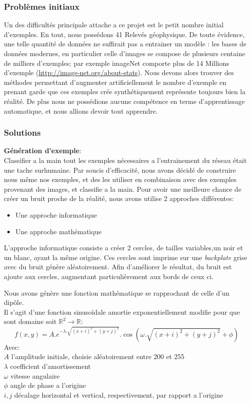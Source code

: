 \documentclass[a4paper, 12pt, titlepage, oneside, french]{article}
\begin{document}
	\subsubsection{Problèmes initiaux}
	Un des difficultés principale attache a ce projet est le petit nombre initial d'exemples. En tout, nous possédons 41 Relevés géophysique. De toute évidence, une telle quantité de données ne suffirait pas a entrainer un modèle : les bases de données modernes, en particulier celle d'images se compose de plusieurs centaine de milliers d'exemples; par exemple imageNet comporte plus de 14 Millions d'exemple (\url{http://image-net.org/about-stats}). Nous devons alors trouver des méthodes permettant d'augmenter artificiellement le nombre d'exemple en prenant garde que ces exemples crée synthétiquement représente toujours bien la réalité. De plus nous ne possédions aucune compétence en terme d'apprentissage automatique, et nous allions devoir tout apprendre. 
	\subsubsection{Solutions}
	\textbf{Génération d'exemple}:\\
	Classifier a la main tout les exemples nécessaires a l'entrainement du réseau était une tache surhumaine. Par soucis d'efficacité, nous avons décidé de construire nous même
	nos exemples, et des les utiliser en combinaison avec des exemples provenant des images, et classifie a la main.
	Pour avoir une meilleure chance de créer un bruit proche de la réalité, nous avons utilise 2 approches différentes:
	\begin{itemize}
		\item Une approche informatique
		\item Une approche mathématique
	\end{itemize}
	L'approche informatique consiste a créer 2 cercles, de tailles variables,un noir et un blanc, ayant la même origine. Ces cercles sont imprime sur une \textit{backplate} grise avec du bruit génère aléatoirement. Afin d'améliorer le résultat, du bruit est ajoute aux cercles, augmentant particulièrement aux bords de ceux ci.

	Nous avons génère une fonction mathématique se rapprochant de celle d'un dipôle.\\
	Il s'agit d'une fonction sinusoïdale amortie exponentiellement modifie pour que sont domaine soit $\mathbb{R}^2 \to \mathbb{R}$:
	\[f(x,y) = A.e^{-\lambda . \sqrt{(x+i)^2+(y+j)^2}}.\cos(\omega . \sqrt{(x+i)^2+(y+j)^2} + \phi)\]
	Avec:\\
	\indent $A$ l'amplitude initiale, choisie aléatoirement entre 200 et 255\\
	\indent$\lambda$ coefficient d'amortissement\\
	\indent$\omega$ vitesse angulaire\\
	\indent$\phi$ angle de phase a l'origine\\
	\indent$i,j$ décalage horizontal et vertical, respectivement, par rapport a l'origine
\end{document}
